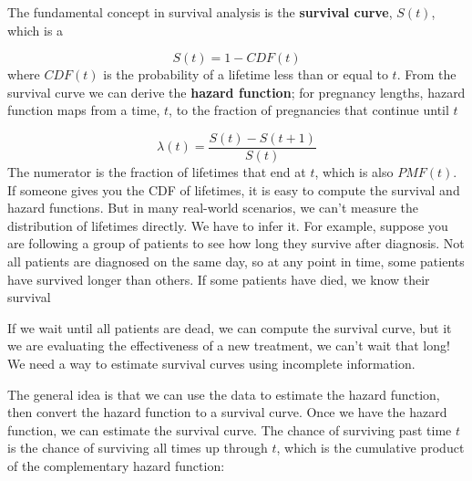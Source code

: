 \documentclass[a4paper,11pt]{article}
\begin{document}


The fundamental concept in survival analysis is the \textbf{survival curve}, $S(t)$, which is a %

\begin{equation}
\label{eq:s}
S(t) = 1 - CDF(t)
\end{equation}
where $CDF(t)$ is the probability of a lifetime less than or equal to $t$.
From the survival curve we can derive the \textbf{hazard function}; for pregnancy lengths, %
hazard function maps from a time, $t$, to the fraction of pregnancies that continue until $t$ %

\begin{equation}
\label{eq:hazard}
\lambda(t) = \frac{ S(t) - S(t+1)}{S(t)}
\end{equation}
The numerator is the fraction of lifetimes that end at $t$, which is also $PMF(t)$.
If someone gives you the CDF of lifetimes, it is easy to compute the survival and hazard functions. But in many real-world scenarios, we can't measure the distribution of lifetimes directly. We have to infer it.
For example, suppose you are following a group of patients to see how long they survive after diagnosis. Not all patients are diagnosed on the same day, so at any point in time, some patients have survived longer than others. If some patients have died, we know their survival %

If we wait until all patients are dead, we can compute the survival curve, but it we are evaluating the effectiveness of a new treatment, we can't wait that long! We need a way to estimate survival curves using incomplete information. 


The general idea is that we can use the data to estimate the hazard function, then convert the hazard function to a survival curve. 
Once we have the hazard function, we can estimate the survival curve. The chance of surviving past time $t$ is the chance of surviving all times up through $t$, which is the cumulative product of the complementary hazard function:
\end{document}
